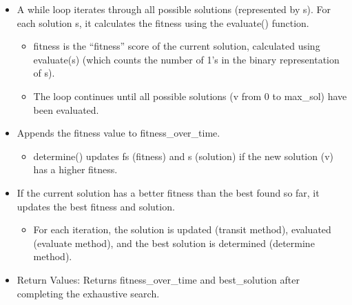 \documentclass[
  letterpaper,
  DIV=11,
  numbers=noendperiod]{scrreprt}
\providecommand{\tightlist}{%
  \setlength{\itemsep}{0pt}\setlength{\parskip}{0pt}}\usepackage{longtable,booktabs,array}
\begin{document}
\begin{itemize}
\tightlist
\item
  A while loop iterates through all possible solutions (represented by
  s). For each solution s, it calculates the fitness using the
  evaluate() function.

  \begin{itemize}
  \tightlist
  \item
    fitness is the ``fitness'' score of the current solution, calculated
    using evaluate(s) (which counts the number of 1's in the binary
    representation of s).
  \item
    The loop continues until all possible solutions (v from 0 to
    max\_sol) have been evaluated.
  \end{itemize}
\item
  Appends the fitness value to fitness\_over\_time.

  \begin{itemize}
  \tightlist
  \item
    determine() updates fs (fitness) and s (solution) if the new
    solution (v) has a higher fitness.
  \end{itemize}
\item
  If the current solution has a better fitness than the best found so
  far, it updates the best fitness and solution.

  \begin{itemize}
  \tightlist
  \item
    For each iteration, the solution is updated (transit method),
    evaluated (evaluate method), and the best solution is determined
    (determine method).
  \end{itemize}
\item
  Return Values: Returns fitness\_over\_time and best\_solution after
  completing the exhaustive search.
\end{itemize}
\end{document}
